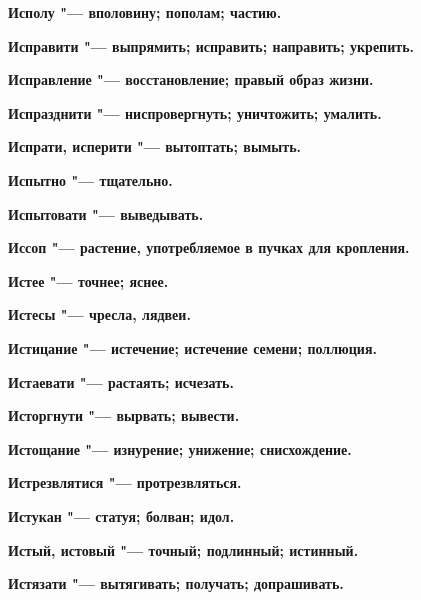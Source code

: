 \begin{mymulticols}{2}
\bfseries Исполу\normalfont{} "--- вполовину; пополам; частию. 




\bfseries Исправити\normalfont{} "--- выпрямить; исправить; направить; укрепить. 




\bfseries Исправление\normalfont{} "--- восстановление; правый образ жизни. 




\bfseries Испразднити\normalfont{} "--- ниспровергнуть; уничтожить; умалить. 




\bfseries Испрати, исперити\normalfont{} "--- вытоптать; вымыть. 




\bfseries Испытно\normalfont{} "--- тщательно. 




\bfseries Испытовати\normalfont{} "--- выведывать. 




\bfseries Иссоп\normalfont{} "--- растение, употребляемое в пучках для кропления. 




\bfseries Истее\normalfont{} "--- точнее; яснее. 




\bfseries Истесы\normalfont{} "--- чресла, лядвеи. 




\bfseries Истицание\normalfont{} "--- истечение; истечение семени; поллюция. 




\bfseries Истаевати\normalfont{} "--- растаять; исчезать. 




\bfseries Исторгнути\normalfont{} "--- вырвать; вывести. 




\bfseries Истощание\normalfont{} "--- изнурение; унижение; снисхождение. 




\bfseries Истрезвлятися\normalfont{} "--- протрезвляться. 




\bfseries Истукан\normalfont{} "--- статуя; болван; идол. 




\bfseries Истый, истовый\normalfont{} "--- точный; подлинный; истинный. 




\bfseries Истязати\normalfont{} "--- вытягивать; получать; допрашивать. 





\end{mymulticols}
